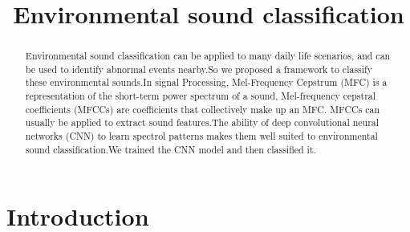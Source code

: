 \documentclass{article}
\title{\LARGE \bf
Environmental sound classification
}
\author{}
\begin{document}
\maketitle

\begin{abstract}
Environmental sound classification can be applied to many daily life scenarios, and can be used to identify abnormal events nearby.So we proposed a framework to classify these environmental sounds.In signal Processing, Mel-Frequency Cepstrum (MFC) is a representation of the short-term power spectrum of a sound, Mel-frequency cepstral coefficients (MFCCs) are coefficients that collectively make up an MFC. MFCCs can usually be applied to extract sound features.The ability of deep convolutional neural networks (CNN) to learn spectrol patterns makes them well suited to environmental sound classification.We trained the CNN model and then classified it.
\end{abstract}
\section{Introduction}
\end{document}

